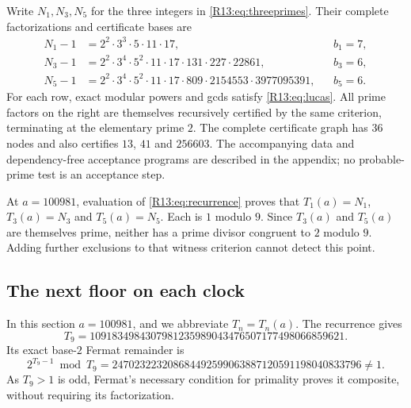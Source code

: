 \documentclass[11pt,a4paper]{article}
\theoremstyle{definition}\newtheorem{definition}[theorem]{Definition}
\theoremstyle{remark}\newtheorem{remark}[theorem]{Remark}
\begin{document}
Write $N_1,N_3,N_5$ for the three integers in \eqref{R13:eq:threeprimes}.
Their complete factorizations and certificate bases are
\begin{equation}\label{R13:eq:mainfactors}
 \begin{aligned}
 N_1-1&=2^2\cdot3^3\cdot5\cdot11\cdot17,
       &&b_1=7,\\
 N_3-1&=2^2\cdot3^4\cdot5^2\cdot11\cdot17
          \cdot131\cdot227\cdot22861,
       &&b_3=6,\\
 N_5-1&=2^2\cdot3^4\cdot5^2\cdot11\cdot17
          \cdot809\cdot2154553\cdot3977095391,
       &&b_5=6.
 \end{aligned}
\end{equation}
For each row, exact modular powers and gcds satisfy \eqref{R13:eq:lucas}.
All prime factors on the right are themselves recursively certified
by the same criterion, terminating at the elementary prime $2$.
The complete certificate graph has $36$ nodes and also certifies
$13$, $41$ and $256603$.
The accompanying data and dependency-free acceptance programs are
described in the appendix; no probable-prime test is an acceptance step.

At $a=100981$, evaluation of \eqref{R13:eq:recurrence} proves that
$T_1(a)=N_1$, $T_3(a)=N_3$ and $T_5(a)=N_5$.
Each is $1$ modulo $9$.
Since $T_3(a)$ and $T_5(a)$ are themselves prime, neither has a
prime divisor congruent to $2$ modulo $9$.
Adding further exclusions to that witness criterion cannot detect
this point.

\subsection{The next floor on each clock}

In this section $a=100981$, and we abbreviate $T_n=T_n(a)$.
The recurrence gives
\begin{equation}\label{R13:eq:T9}
 T_9=1091834984307981235989043476507177498066859621.
\end{equation}
Its exact base-$2$ Fermat remainder is
\begin{equation}\label{R13:eq:fermat}
 2^{T_9-1}\bmod T_9
 =247023223208684492599063887120591198040833796\ne1.
\end{equation}
As $T_9>1$ is odd, Fermat's necessary condition for primality
proves it composite, without requiring its factorization.
\end{document}
